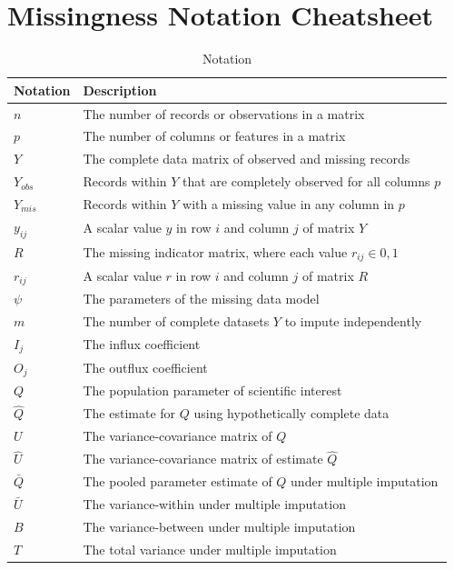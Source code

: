 \documentclass[12pt,oneside]{chicagocapstone}
\begin{document}
\chapter{Missingness Notation
Cheatsheet}\label{missingness-notation-cheatsheet}
\begin{table}[!h]

\caption{\label{tab:appendixbnotation}Notation}
\begin{tabu} to 
\toprule
\begingroup\fontsize{13}{15}\selectfont \textbf{Notation}\endgroup & \begingroup\fontsize{13}{15}\selectfont \textbf{Description}\endgroup\\
\midrule
$n$ & The number of records or observations in a matrix\\
$p$ & The number of columns or features in a matrix\\
$Y$ & The complete data matrix of observed and missing records\\
$Y_{obs}$ & Records within $Y$ that are completely observed for all columns $p$\\
$Y_{mis}$ & Records within $Y$ with a missing value in any column in $p$\\
\addlinespace
$y_{ij}$ & A scalar value $y$ in row $i$ and column $j$ of matrix $Y$\\
$R$ & The missing indicator matrix, where each value $r_{ij} \in 0,1$\\
$r_{ij}$ & A scalar value $r$ in row $i$ and column $j$ of matrix $R$\\
$\psi$ & The parameters of the missing data model\\
$m$ & The number of complete datasets $Y$ to impute independently\\
\addlinespace
$I_j$ & The influx coefficient\\
$O_j$ & The outflux coefficient\\
$Q$ & The population parameter of scientific interest\\
$\hat Q$ & The estimate for $Q$ using hypothetically complete data\\
$U$ & The variance-covariance matrix of $Q$\\
\addlinespace
$\hat U$ & The variance-covariance matrix of estimate $\hat Q$\\
$\bar Q$ & The pooled parameter estimate of $Q$ under multiple imputation\\
$\bar U$ & The variance-within under multiple imputation\\
$B$ & The variance-between under multiple imputation\\
$T$ & The total variance under multiple imputation\\
\bottomrule
\end{tabu}
\end{table}
\end{document}
